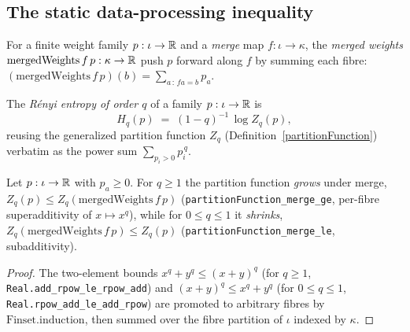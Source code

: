 \subsection*{The static data-processing inequality}

\begin{definition}\label{mergedWeights}
  \leanok
  For a finite weight family \(p : \iota \to \mathbb{R}\) and a \emph{merge} map \(f : \iota \to \kappa\),
  the \emph{merged weights} \(\mathrm{mergedWeights}\,f\,p : \kappa \to \mathbb{R}\) push \(p\) forward along
  \(f\) by summing each fibre: \((\mathrm{mergedWeights}\,f\,p)(b) = \sum_{a \,:\, f a = b} p_a\).
\end{definition}

\begin{definition}\label{renyiEntropy}
  \leanok
  The \emph{R\'enyi entropy of order \(q\)} of a family \(p : \iota \to \mathbb{R}\) is
  \[
    H_q(p) \;=\; (1 - q)^{-1} \, \log Z_q(p),
  \]
  reusing the generalized partition function \(Z_q\) (Definition~\ref{partitionFunction}) verbatim as
  the power sum \(\sum_{p_i > 0} p_i^{\,q}\).
\end{definition}

\begin{lemma}\label{partitionFunction_merge}
  \leanok
  Let \(p : \iota \to \mathbb{R}\) with \(p_a \ge 0\). For \(q \ge 1\) the partition function \emph{grows}
  under merge, \(Z_q(p) \le Z_q(\mathrm{mergedWeights}\,f\,p)\)
  (\texttt{partitionFunction\_merge\_ge}, per-fibre superadditivity of \(x \mapsto x^q\)), while for
  \(0 \le q \le 1\) it \emph{shrinks}, \(Z_q(\mathrm{mergedWeights}\,f\,p) \le Z_q(p)\)
  (\texttt{partitionFunction\_merge\_le}, subadditivity).
\end{lemma}
\begin{proof}\leanok
  The two-element bounds \(x^q + y^q \le (x+y)^q\) (for \(q \ge 1\),
  \texttt{Real.add\_rpow\_le\_rpow\_add}) and \((x+y)^q \le x^q + y^q\) (for \(0 \le q \le 1\),
  \texttt{Real.rpow\_add\_le\_add\_rpow}) are promoted to arbitrary fibres by
  \(\mathrm{Finset.induction}\), then summed over the fibre partition of \(\iota\) indexed by
  \(\kappa\).
\end{proof}

